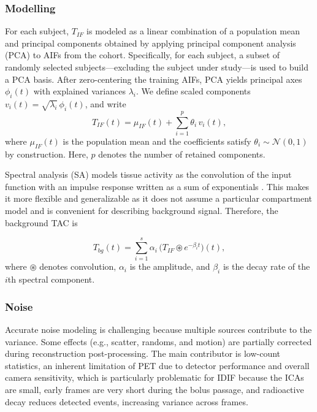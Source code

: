 \subsubsection{Modelling}\label{sec:bgtm_modelling}
For each subject, \(T_{IF}\) is modeled as a linear combination of a population mean and principal components obtained by applying principal component analysis (PCA) to AIFs from the cohort.
Specifically, for each subject, a subset of randomly selected subjects—excluding the subject under study—is used to build a PCA basis.
After zero-centering the training AIFs, PCA yields principal axes \(\phi_i(t)\) with explained variances \(\lambda_i\).
We define scaled components \(v_i(t) = \sqrt{\lambda_i}\,\phi_i(t)\), and write
\begin{equation}
	T_{IF}(t) = \mu_{IF}(t) + \sum_{i=1}^p \theta_i\,v_i(t),
\end{equation}
where \(\mu_{IF}(t)\) is the population mean and the coefficients satisfy \(\theta_i \sim \mathcal{N}(0,1)\) by construction.
Here, \(p\) denotes the number of retained components.

Spectral analysis (SA) models tissue activity as the convolution of the input function with an impulse response written as a sum of exponentials \cite{cunningham1993spectral}.
This makes it more flexible and generalizable as it does not assume a particular compartment model and is convenient for describing background signal.
Therefore, the background TAC is

\begin{equation}
	T_{bg}(t) = \sum_{i=1}^s \alpha_{i} \,\bigl(T_{IF} \circledast e^{-\beta_{i} t}\bigr)(t),
\end{equation}
where \(\circledast\) denotes convolution, \(\alpha_i\) is the amplitude, and \(\beta_i\) is the decay rate of the \(i\)th spectral component.

\subsubsection{Noise}
Accurate noise modeling is challenging because multiple sources contribute to the variance.
Some effects (e.g., scatter, randoms, and motion) are partially corrected during reconstruction post-processing.
The main contributor is low-count statistics, an inherent limitation of PET due to detector performance and overall camera sensitivity, which is particularly problematic for IDIF because the ICAs are small, early frames are very short during the bolus passage, and radioactive decay reduces detected events, increasing variance across frames.

